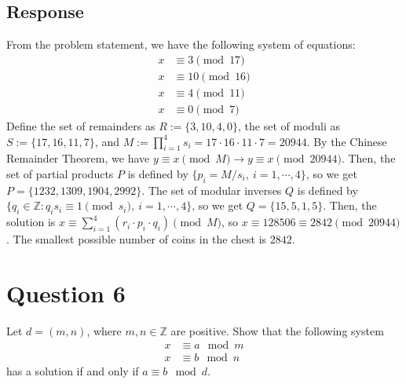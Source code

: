 \documentclass [12pt] {article}
\newcommand{\Z}{\mathbb{Z}}
\begin{document}
\subsection*{Response}
From the problem statement, we have the following system of equations:
\begin{align*}
    x &\equiv 3 \pmod{17} \\
    x &\equiv 10 \pmod{16} \\
    x &\equiv 4 \pmod{11} \\
    x &\equiv 0 \pmod{7}
\end{align*}
Define the set of remainders as $R := \{3, 10, 4, 0\}$, the set of moduli as $S := \{17, 16, 11, 7\}$,
and $M := \prod^{4}_{i = 1} s_i = 17 \cdot 16 \cdot 11 \cdot 7 = 20944$. By the Chinese Remainder 
Theorem, we have $y \equiv x \pmod{M} \to y \equiv x \pmod{20944}$. Then, the set of partial products
$P$ is defined by $\{p_i = M / s_i, \ i = 1, \cdots, 4\}$, so we get $P = \{1232, 1309, 1904, 2992\}$. The set of modular
inverses $Q$ is defined by $\{q_i \in \Z : q_i s_i \equiv 1 \pmod{s_i}, \ i = 1, \cdots, 4\}$, so we get $Q = \{15, 5, 1, 5\}$. 
Then, the solution is $x \equiv \sum^{4}_{i = 1} (r_i \cdot p_i \cdot q_i) \pmod{M}$, so
$x \equiv 128506 \equiv 2842 \pmod{20944}$. The smallest possible number of coins in the chest is
$2842$.


\newpage

\section*{Question 6}
Let $d=(m,n)$, where $m,n\in\Z$ are positive. Show that the following system 
\begin{align*}
    x& \equiv a\mod m \\
    x& \equiv b\mod n
\end{align*}
has a solution if and only if $a\equiv b\mod d$.
\end{document}
